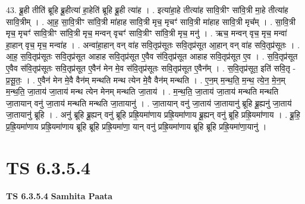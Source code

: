 \documentclass[17pt]{extarticle}
\begin{document}
43. ब्रू॒ही तीति॑ ब्रूहि ब्रू॒हीत्या॑ हा॒हेति॑ ब्रूहि ब्रू॒ही त्या॑ह । . इत्या॑हा॒हे तीत्या॑ह सावि॒त्रीꣳ सा॑वि॒त्री मा॒हे तीत्या॑ह सावि॒त्रीम् । . आ॒ह॒ सा॒वि॒त्रीꣳ सा॑वि॒त्री मा॑हाह सावि॒त्री मृच॒ मृचꣳ॑ सावि॒त्री मा॑हाह सावि॒त्री मृच᳚म् । . सा॒वि॒त्री मृच॒ मृचꣳ॑ सावि॒त्रीꣳ सा॑वि॒त्री मृच॒ मन्वन् वृचꣳ॑ सावि॒त्रीꣳ सा॑वि॒त्री मृच॒ मनु॑ । . ऋच॒ मन्वन् वृच॒ मृच॒ मन्वा॑ हा॒हान् वृच॒ मृच॒ मन्वा॑ह । . अन्वा॑हा॒हान् वन् वा॑ह सवि॒तृप्र॑सूतः सवि॒तृप्र॑सूत आ॒हान् वन् वा॑ह सवि॒तृप्र॑सूतः । . आ॒ह॒ स॒वि॒तृप्र॑सूतः सवि॒तृप्र॑सूत आहाह सवि॒तृप्र॑सूत ए॒वैव स॑वि॒तृप्र॑सूत आहाह सवि॒तृप्र॑सूत ए॒व । . स॒वि॒तृप्र॑सूत ए॒वैव स॑वि॒तृप्र॑सूतः सवि॒तृप्र॑सूत ए॒वैन॑ मेन मे॒व स॑वि॒तृप्र॑सूतः सवि॒तृप्र॑सूत ए॒वैन᳚म् । . स॒वि॒तृप्र॑सूत॒ इति॑ सवि॒तृ - प्र॒सू॒तः॒ । . ए॒वैन॑ मेन मे॒वै वैन॑म् मन्थति मन्थ त्येन मे॒वै वैन॑म् मन्थति । . ए॒न॒म् म॒न्थ॒ति॒ म॒न्थ॒ त्ये॒न॒ मे॒न॒म् म॒न्थ॒ति॒ जा॒ताय॑ जा॒ताय॑ मन्थ त्येन मेनम् मन्थति जा॒ताय॑ । . म॒न्थ॒ति॒ जा॒ताय॑ जा॒ताय॑ मन्थति मन्थति जा॒तायान् वनु॑ जा॒ताय॑ मन्थति मन्थति जा॒तायानु॑ । . जा॒तायान् वनु॑ जा॒ताय॑ जा॒तायानु॑ ब्रूहि ब्रू॒ह्यनु॑ जा॒ताय॑ जा॒तायानु॑ ब्रूहि । . अनु॑ ब्रूहि ब्रू॒ह्यन् वनु॑ ब्रूहि प्रह्रि॒यमा॑णाय प्रह्रि॒यमा॑णाय ब्रू॒ह्यन् वनु॑ ब्रूहि प्रह्रि॒यमा॑णाय । . ब्रू॒हि॒ प्र॒ह्रि॒यमा॑णाय प्रह्रि॒यमा॑णाय ब्रूहि ब्रूहि प्रह्रि॒यमा॑णा॒ यान् वनु॑ प्रह्रि॒यमा॑णाय ब्रूहि ब्रूहि प्रह्रि॒यमा॑णा॒यानु॑ । \newline
\pagebreak
{}

\section{ TS 6.3.5.4 }

\textbf{TS 6.3.5.4 } \newline
\textbf{Samhita Paata} \newline
\end{document}
